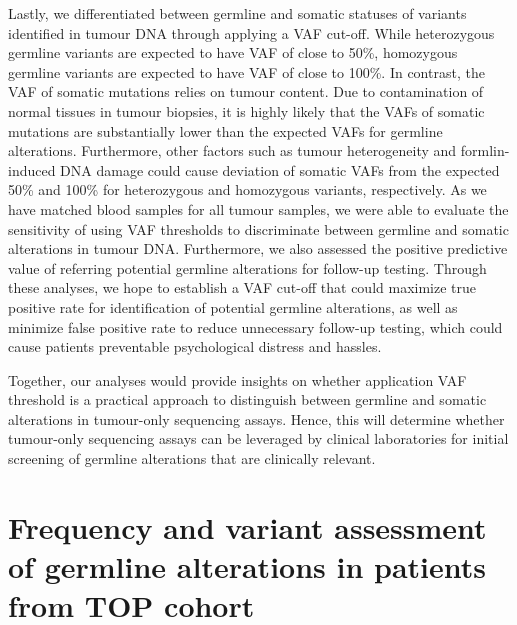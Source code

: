 Lastly, we differentiated between germline and somatic statuses of variants identified in tumour DNA through applying a VAF cut-off. While heterozygous germline variants are expected to have VAF of close to 50\%, homozygous germline variants are expected to have VAF of close to 100\%. In contrast, the VAF of somatic mutations relies on tumour content. Due to contamination of normal tissues in tumour biopsies, it is highly likely that the VAFs of somatic mutations are substantially lower than the expected VAFs for germline alterations. Furthermore, other factors such as tumour heterogeneity and formlin-induced DNA damage could cause deviation of somatic VAFs from the expected 50\% and 100\% for heterozygous and homozygous variants, respectively. As we have matched blood samples for all tumour samples, we were able to evaluate the sensitivity of using VAF thresholds to discriminate between germline and somatic alterations in tumour DNA. Furthermore, we also assessed the positive predictive value of referring potential germline alterations for follow-up testing. Through these analyses, we hope to establish a VAF cut-off that could maximize true positive rate for identification of potential germline alterations, as well as minimize false positive rate to reduce unnecessary follow-up testing, which could cause patients preventable psychological distress and hassles.

Together, our analyses would provide insights on whether application VAF threshold is a practical approach to distinguish between germline and somatic alterations in tumour-only sequencing assays. Hence, this will determine whether tumour-only sequencing assays can be leveraged by clinical laboratories for initial screening of germline alterations that are clinically relevant.

\section{Frequency and variant assessment of germline alterations in patients from TOP cohort}
\label{sec:FrequencyandvariantassessmentofgermlinealterationsinpatientsfromTOPcohort}

